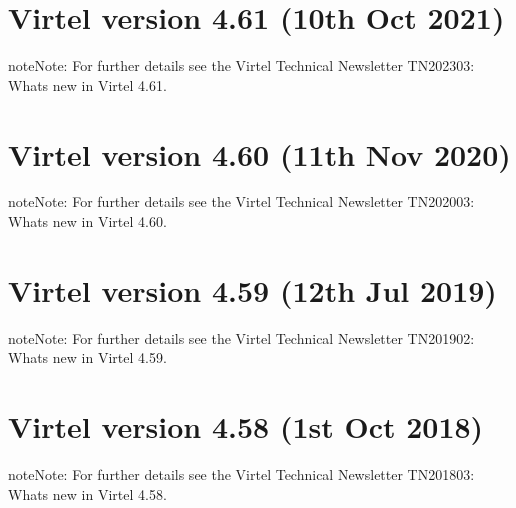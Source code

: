 \documentclass[letterpaper,10pt,english]{sphinxmanual}
\begin{document}
\section{Virtel version 4.61 (10th Oct 2021)}
\label{\detokenize{Installation_Guide:virtel-version-4-61-10th-oct-2021}}
\begin{sphinxadmonition}{note}{Note:}
\sphinxAtStartPar
For further details see the Virtel Technical Newsletter TN202303: Whats new in Virtel 4.61.
\end{sphinxadmonition}


\section{Virtel version 4.60 (11th Nov 2020)}
\label{\detokenize{Installation_Guide:virtel-version-4-60-11th-nov-2020}}
\begin{sphinxadmonition}{note}{Note:}
\sphinxAtStartPar
For further details see the Virtel Technical Newsletter TN202003: Whats new in Virtel 4.60.
\end{sphinxadmonition}


\section{Virtel version 4.59 (12th Jul 2019)}
\label{\detokenize{Installation_Guide:virtel-version-4-59-12th-jul-2019}}
\begin{sphinxadmonition}{note}{Note:}
\sphinxAtStartPar
For further details see the Virtel Technical Newsletter TN201902: Whats new in Virtel 4.59.
\end{sphinxadmonition}


\section{Virtel version 4.58 (1st Oct 2018)}
\label{\detokenize{Installation_Guide:virtel-version-4-58-1st-oct-2018}}
\begin{sphinxadmonition}{note}{Note:}
\sphinxAtStartPar
For further details see the Virtel Technical Newsletter TN201803: Whats new in Virtel 4.58.
\end{sphinxadmonition}
\end{document}
